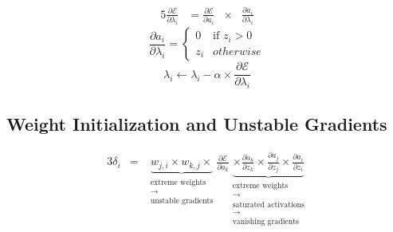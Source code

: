\documentclass[xcolor={table}]{beamer}
\begin{document}
 \begin{frame} 
\begin{alignat}{5}
\frac{\partial \mathcal{E}}{\partial \lambda_{i}} &= \frac{\partial \mathcal{E}}{\partial a_i} &\times&  \frac{\partial a_i}{\partial \lambda_i}
\label{eq:errorgradientwithrespecttolambda}
\end{alignat}
\begin{equation}
\frac{\partial a_i}{\partial \lambda_i} = 	\begin{cases}
		0 & \text{if } z_i > 0\\
		z_i & otherwise
	\end{cases}
	\label{eqn:preluegradientwithrespecttolambda}
\end{equation}
\begin{equation}
\lambda_{i} \leftarrow \lambda_{i} - \alpha \times \frac{\partial \mathcal{E}}{\partial \lambda_{i}}
\label{eq:lambdaupdaterule}
\end{equation}
\end{frame} 

\subsection{Weight Initialization and Unstable Gradients}

 \begin{frame} 
\begin{alignat}{3}
\delta_i & = & 
	\underbrace{ w_{j,i} \times w_{k,j} \times }_{ \substack{\text{extreme weights}\\ \rightarrow \\\text{unstable gradients}}}
	\frac{\partial \mathcal{E}}{\partial a_k} 
	\underbrace{ \times \frac{\partial a_k}{\partial z_k} \times \frac{\partial a_j}{\partial z_j} \times \frac{\partial a_i}{\partial z_i} }_{\substack{\text{extreme weights}\\ \rightarrow \\ \text{saturated activations} \\ \rightarrow \\ \text{vanishing gradients}}}  
\label{eq:weightandunstablegradients}
\end{alignat}
\end{frame} 
\end{document}
